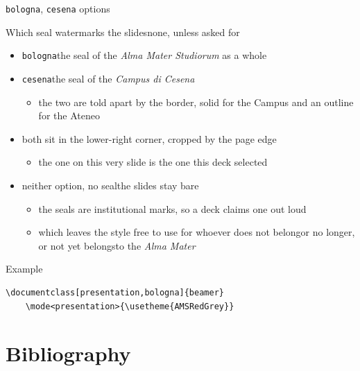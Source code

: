 \documentclass[presentation,cesena,apice]{beamer}\mode<presentation>{\usetheme{AMSRedGrey}}
\begin{document}
\begin{frame}[c,fragile]{\texttt{bologna}, \texttt{cesena} options}
%
\begin{alertblock}{Which seal watermarks the slides\textemdash{}none, unless asked for}
\begin{itemize}
	\item \texttt{bologna}\textemdash{}the seal of the \emph{Alma Mater Studiorum} as a whole
	\item \texttt{cesena}\textemdash{}the seal of the \emph{Campus di Cesena}
	\begin{itemize}
		\item the two are told apart by the border, solid for the Campus and an outline for the Ateneo
	\end{itemize}
	\item both sit in the lower-right corner, cropped by the page edge
	\begin{itemize}
		\item the one on this very slide is the one this deck selected
	\end{itemize}
	\item \alert{neither option, no seal}\textemdash{}the slides stay bare
	\begin{itemize}
		\item the seals are institutional marks, so a deck claims one out loud
		\item which leaves the style free to use for whoever does not belong\textemdash{}or no longer, or not yet belongs\textemdash{}to the \emph{Alma Mater}
	\end{itemize}
\end{itemize}
\end{alertblock}
%
\begin{exampleblock}{Example}
{\scriptsize\begin{verbatim}
\documentclass[presentation,bologna]{beamer}
    \mode<presentation>{\usetheme{AMSRedGrey}}
\end{verbatim}} %
\end{exampleblock}
%
\end{frame}

\section{Bibliography}
\end{document}
